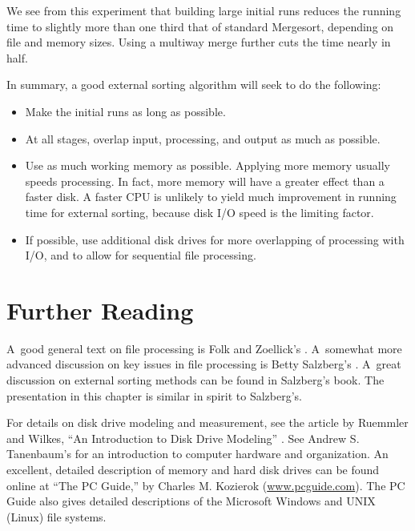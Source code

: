 We see from this experiment that building large initial runs reduces
the running time to slightly more than one third that of standard
Mergesort, depending on file and memory sizes.
Using a multi\-way merge further cuts the time nearly in half.

In summary, a good external sorting algorithm will seek to do the
following:

\begin{itemize}

\item Make the initial runs as long as possible.

\item At all stages, overlap input, processing, and output as much as
possible.

\item Use as much working memory as possible.
Applying more memory usually speeds processing.
In fact, more memory will have a greater effect than a faster disk.
A faster CPU is unlikely to yield much improvement in running time for
external sorting, because disk I/O speed is the limiting factor.

\item If possible, use additional disk drives for more overlapping of
processing with I/O, and to allow for sequential file
processing.
\end{itemize}

\section{Further Reading}
\label{ESFurRead}

A~good general text on file processing is
Folk and Zoellick's
 \cite{FZ}.
A~somewhat more advanced discussion on key issues in
file processing is Betty Salzberg's  \cite{Salzberg}.
A~great discussion on external sorting methods can be
found in Salzberg's book.
The presentation in this chapter is similar in spirit to Salzberg's.

For details on disk drive modeling and measurement, see 
the article by Ruemmler and Wilkes,
``An Introduction to Disk Drive Modeling'' \cite{Disk}.
See Andrew S. Tanenbaum's 
\cite{Tanenbaum} for an introduction to computer hardware and
organization.
An excellent, detailed description of memory and hard disk drives can
be found online at ``The PC Guide,'' by
Charles M. Kozierok \cite{PCguide} (\url{www.pcguide.com}).
The PC Guide also gives detailed descriptions of the
Microsoft Windows
and UNIX (Linux) file systems.

